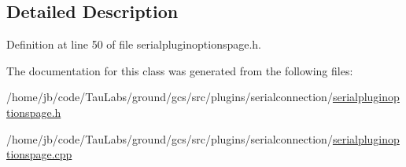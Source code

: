 \subsection{\-Detailed \-Description}


\-Definition at line 50 of file serialpluginoptionspage.\-h.



\-The documentation for this class was generated from the following files\-:\begin{DoxyCompactItemize}
\item 
/home/jb/code/\-Tau\-Labs/ground/gcs/src/plugins/serialconnection/\hyperlink{serialpluginoptionspage_8h}{serialpluginoptionspage.\-h}\item 
/home/jb/code/\-Tau\-Labs/ground/gcs/src/plugins/serialconnection/\hyperlink{serialpluginoptionspage_8cpp}{serialpluginoptionspage.\-cpp}\end{DoxyCompactItemize}
